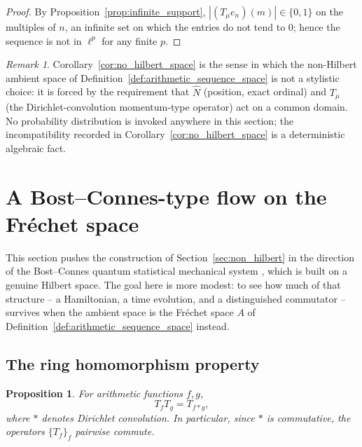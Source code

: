 \documentclass[11pt]{amsart}
\numberwithin{equation}{section}
\theoremstyle{plain}
\newtheorem{proposition}[theorem]{Proposition}
\theoremstyle{definition}
\theoremstyle{remark}
\newtheorem{remark}[theorem]{Remark}
\begin{document}
\begin{proof}
By Proposition~\ref{prop:infinite_support}, $|(T_\mu e_n)(m)|\in\{0,1\}$
on the multiples of $n$, an infinite set on which the entries do not
tend to $0$; hence the sequence is not in $\ell^p$ for any finite $p$.
\end{proof}

\begin{remark}
\label{rem:non_hilbert_motivated}
Corollary~\ref{cor:no_hilbert_space} is the sense in which the
non-Hilbert ambient space of
Definition~\ref{def:arithmetic_sequence_space} is not a stylistic
choice: it is forced by the requirement that $\hat N$ (position, exact
ordinal) and $T_\mu$ (the Dirichlet-convolution momentum-type
operator) act on a common domain. No probability distribution is
invoked anywhere in this section; the incompatibility recorded in
Corollary~\ref{cor:no_hilbert_space} is a deterministic algebraic fact.
\end{remark}

\section{A Bost--Connes-type flow on the Fr\'echet space}
\label{sec:bc_flow}

This section pushes the construction of Section~\ref{sec:non_hilbert}
in the direction of the Bost--Connes quantum statistical mechanical
system \cite{BostConnes1995}, which is built on a genuine Hilbert
space. The goal here is more modest: to see how much of that structure
-- a Hamiltonian, a time evolution, and a distinguished commutator --
survives when the ambient space is the Fr\'echet space $A$ of
Definition~\ref{def:arithmetic_sequence_space} instead.

\subsection{The ring homomorphism property}
\label{subsec:bc_flow_ring_hom}

\begin{proposition}
\label{prop:convolution_operator_homomorphism}
For arithmetic functions $f,g$,
\begin{equation}
T_f T_g = T_{f*g},
\label{eq:convolution_operator_homomorphism}
\end{equation}
where $*$ denotes Dirichlet convolution. In particular, since $*$ is
commutative, the operators $\{T_f\}_f$ pairwise commute.
\end{proposition}
\end{document}
